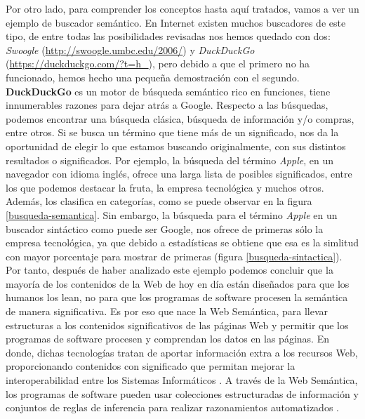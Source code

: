 Por otro lado, para comprender los conceptos hasta aquí tratados, vamos a ver un ejemplo de buscador semántico. En Internet existen muchos buscadores de este tipo, de entre todas las posibilidades revisadas \cite{buscadores-semanticos} nos hemos quedado con dos: \textit{Swoogle} (\url{http://swoogle.umbc.edu/2006/}) y \textit{DuckDuckGo} (\url{https://duckduckgo.com/?t=h_}), pero debido a que el primero no ha funcionado, hemos hecho una pequeña demostración con el segundo. \textbf{DuckDuckGo} es un motor de búsqueda semántico rico en funciones, tiene innumerables razones para dejar atrás a Google. Respecto a las búsquedas, podemos encontrar una búsqueda clásica, búsqueda de información y/o compras, entre otros. Si se busca un término que tiene más de un significado, nos da la oportunidad de elegir lo que estamos buscando originalmente, con sus distintos resultados o significados. Por ejemplo, la búsqueda del término \textit{Apple}, en un navegador con idioma inglés, ofrece una larga lista de posibles significados, entre los que podemos destacar la fruta, la empresa tecnológica y muchos otros. Además, los clasifica en categorías, como se puede observar en la figura \ref{busqueda-semantica}. Sin embargo, la búsqueda para el término \textit{Apple} en un buscador sintáctico como puede ser Google, nos ofrece de primeras sólo la empresa tecnológica, ya que debido a estadísticas se obtiene que esa es la simlitud con mayor porcentaje para mostrar de primeras (figura \ref{busqueda-sintactica}).\\


Por tanto, después de haber analizado este ejemplo podemos concluir que la mayoría de los contenidos de la Web de hoy en día están diseñados para que los humanos los lean, no para que los programas de software procesen la semántica de manera significativa. Es por eso que nace la Web Semántica, para llevar estructuras a los contenidos significativos de las páginas Web y permitir que los programas de software procesen y comprendan los datos en las páginas. En donde, dichas tecnologías tratan de aportar información extra a los recursos Web, proporcionando contenidos con significado que permitan mejorar la interoperabilidad entre los Sistemas Informáticos \cite{aplicacion}. A través de la Web Semántica, los programas de software pueden usar colecciones estructuradas de información y conjuntos de reglas de inferencia para realizar razonamientos automatizados \cite{libro-gis}. \\

